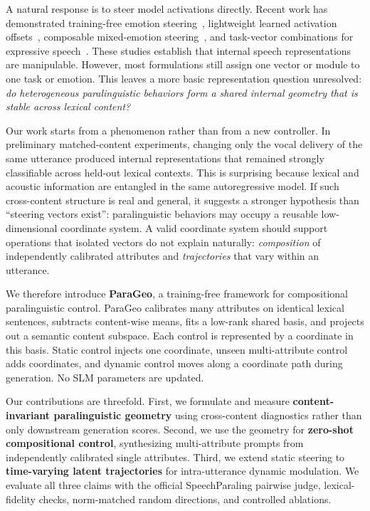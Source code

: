 \documentclass{article}
\begin{document}
A natural response is to steer model activations directly. Recent work has demonstrated training-free emotion steering~\cite{xie2025emosteer}, lightweight learned activation offsets~\cite{zhou2026emoshift}, composable mixed-emotion steering~\cite{wang2026cocoemo}, and task-vector combinations for expressive speech~\cite{feng2025taskvector}. These studies establish that internal speech representations are manipulable. However, most formulations still assign one vector or module to one task or emotion. This leaves a more basic representation question unresolved: \emph{do heterogeneous paralinguistic behaviors form a shared internal geometry that is stable across lexical content?}

Our work starts from a phenomenon rather than from a new controller. In preliminary matched-content experiments, changing only the vocal delivery of the same utterance produced internal representations that remained strongly classifiable across held-out lexical contexts. This is surprising because lexical and acoustic information are entangled in the same autoregressive model. If such cross-content structure is real and general, it suggests a stronger hypothesis than ``steering vectors exist'': paralinguistic behaviors may occupy a reusable low-dimensional coordinate system. A valid coordinate system should support operations that isolated vectors do not explain naturally: \emph{composition} of independently calibrated attributes and \emph{trajectories} that vary within an utterance.

We therefore introduce \textbf{ParaGeo}, a training-free framework for compositional paralinguistic control. ParaGeo calibrates many attributes on identical lexical sentences, subtracts content-wise means, fits a low-rank shared basis, and projects out a semantic content subspace. Each control is represented by a coordinate in this basis. Static control injects one coordinate, unseen multi-attribute control adds coordinates, and dynamic control moves along a coordinate path during generation. No SLM parameters are updated.

Our contributions are threefold. First, we formulate and measure \textbf{content-invariant paralinguistic geometry} using cross-content diagnostics rather than only downstream generation scores. Second, we use the geometry for \textbf{zero-shot compositional control}, synthesizing multi-attribute prompts from independently calibrated single attributes. Third, we extend static steering to \textbf{time-varying latent trajectories} for intra-utterance dynamic modulation. We evaluate all three claims with the official SpeechParaling pairwise judge, lexical-fidelity checks, norm-matched random directions, and controlled ablations.
\end{document}
